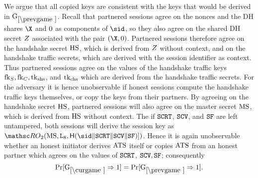 \begin{collectinmacro}{\TLSProofFull}{}{}
We argue that all copied keys are consistent with the keys that would be derived in $\prevGm$.
Recall that partnered sessions agree on the nonces and the DH shares $\X$ and $\Y$ as components of $\sid$, so they also agree on the shared DH secret $Z$ associated with the pair $(\X,\Y)$. 
Partnered sessions therefore agree on the handshake secret $\mathrm{HS}$, which is derived from $Z$ without context, and on the handshake traffic secrets, which are derived with the session identifier as context.
Thus partnered sessions agree on the values of the handshake traffic keys $\mathrm{fk}_S,\mathrm{fk}_C,\mathrm{tk}_{\text{shs}}$, and $\mathrm{tk}_{\text{chs}}$ which are derived from the handshake traffic secrets. 
For the adversary it is hence unobservable if honest sessions compute the handshake traffic keys themselves, or copy the keys from their partners.
By agreeing on the handshake secret $\mathrm{HS}$, partnered sessions will also agree on the master secret $\mathrm{MS}$, which is derived from $\mathrm{HS}$ without context. 
The if $\mathtt{SCRT}$, $\mathtt{SCV}$, and $\mathtt{SF}$ are left untampered, both sessions will derive the session key as $\RO_2(\MS, \inputlabel[8],\Hash(\sid \conc \sSCERT \conc \sSCERTV \conc \sSFIN)])$. Hence it is again unobservable whether an honest initiator derives $\mathrm{ATS}$ itself or copies $\mathrm{ATS}$ from an honest partner which agrees on the values of $\mathtt{SCRT}$, $\mathtt{SCV},\mathtt{SF}$; consequently
\[ \Pr[\curGm* \Rightarrow 1] = \Pr[\prevGm* \Rightarrow 1].\]



\end{collectinmacro}
